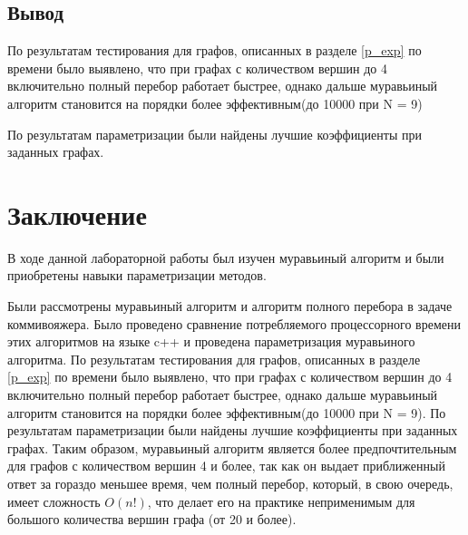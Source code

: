 \documentclass[a4paper, 14pt]{article}
\begin{document}
	\subsection{Вывод}
	По результатам тестирования для графов, описанных в разделе \ref{p_exp}  по времени было выявлено, что при графах с количеством вершин до 4 включительно полный перебор работает быстрее, однако дальше муравьиный алгоритм становится на порядки более эффективным(до 10000 при N = 9)
	
	По результатам параметризации были найдены лучшие коэффициенты при заданных графах.
    	\newpage
        \section*{Заключение}
		В ходе данной лабораторной работы был изучен муравьиный алгоритм и были приобретены навыки параметризации методов.
			
		Были рассмотрены муравьиный алгоритм и алгоритм полного перебора в задаче коммивояжера. Было проведено сравнение потребляемого процессорного времени этих алгоритмов на языке c++ и проведена параметризация муравьиного алгоритма. По результатам тестирования для графов, описанных в разделе \ref{p_exp}  по времени было выявлено, что при графах с количеством вершин до 4 включительно полный перебор работает быстрее, однако дальше муравьиный алгоритм становится на порядки более эффективным(до 10000 при N = 9). По результатам параметризации были найдены лучшие коэффициенты при заданных графах. Таким образом, муравьиный алгоритм является более предпочтительным для графов с количеством вершин 4 и более, так как он выдает приближенный ответ за гораздо меньшее время, чем полный перебор, который, в свою очередь, имеет сложность $O(n!)$, что делает его на практике неприменимым для большого количества вершин графа (от 20 и более).
\end{document}
